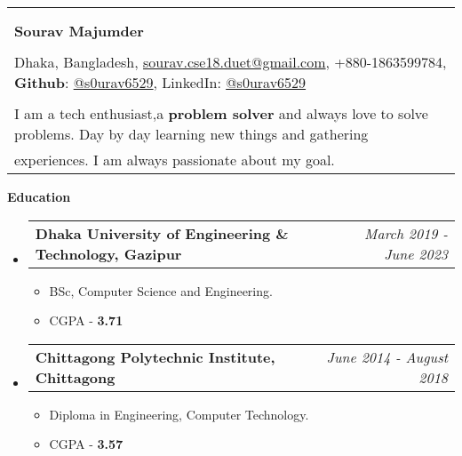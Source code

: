 \documentclass[legalpaper,10pt]{article}
\makeatletter
\newcommand{\resheading}[1]{{\large \colorbox{mygrey}{\begin{minipage}{\textwidth}{\textbf{#1 \vphantom{p\^{E}}}}\end{minipage}}}}
\newcommand{\ressubheading}[4]{
	\begin{tabular*}{7.1in}{l@{\extracolsep{\fill}}r}
		\textbf{#1} & \textit{#4} \\
	\end{tabular*}\vspace{-6pt}}
\makeatother
\begin{document}
	\begin{tabular*}{7.5in}{l@{\extracolsep{\fill}}}
		\\
		\\
		\\
		\textbf{\large Sourav Majumder}\\
		\\
		Dhaka, Bangladesh, \href{mailto:sourav.cse18.duet@gmail.com}{sourav.cse18.duet@gmail.com}, +880-1863599784, \textbf{Github}: \href{https://github.com/s0urav6529}{@s0urav6529}, LinkedIn: \href{https://www.linkedin.com/in/s0urav6529/}{@s0urav6529} 
		\\
		\\
		I am a tech enthusiast,a \textbf{problem solver} and always love to solve problems.         Day by day learning new things and gathering \\ experiences. I am always
            passionate about my goal.
	\end{tabular*}
	
	\vspace{0.15in}
	
	\resheading{Education}
	\begin{itemize}
	
		\item \ressubheading{Dhaka University of Engineering \& Technology, Gazipur}{}{}{March 2019 - June 2023}
		\begin{itemize}
			\item BSc, Computer Science and Engineering.
                \item CGPA - \textbf{3.71}
		\end{itemize}

            \item \ressubheading{Chittagong Polytechnic Institute, Chittagong}{}{}{June 2014 - August 2018}
		\begin{itemize}
			\item Diploma in Engineering, Computer Technology.
                \item CGPA - \textbf{3.57}
		\end{itemize}
	
	\end{itemize}
	
	\vspace{0.15in}
	
\end{document}
